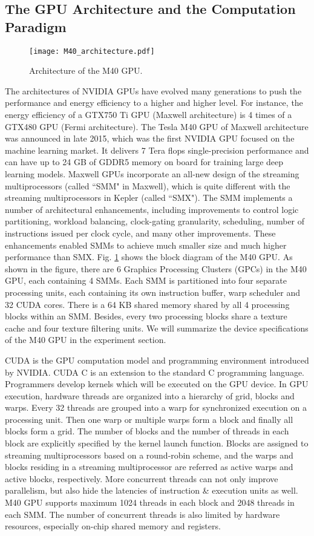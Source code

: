 \documentclass[format=acmsmall, review=false, screen=true]{acmart}
\begin{document}
\subsection{The GPU Architecture and the Computation Paradigm}
\begin{figure}[t]
    \centering
    \texttt{[image: M40\_architecture.pdf]}
    \caption{Architecture of the M40 GPU.}
    \label{pic_m40_architecture}
\end{figure}
The architectures of NVIDIA GPUs have evolved many generations to push the performance and energy efficiency to a higher and higher level. For instance, the energy efficiency of a GTX750 Ti GPU (Maxwell architecture) is 4 times of a GTX480 GPU (Fermi architecture). The Tesla M40 GPU of Maxwell architecture was announced in late 2015, which was the first NVIDIA GPU focused on the machine learning market. It delivers 7 Tera flops single-precision performance and can have up to 24 GB of GDDR5 memory on board for training large deep learning models. Maxwell GPUs incorporate an all-new design of the streaming multiprocessors (called ``SMM" in Maxwell), which is quite different with the streaming multiprocessors in Kepler (called ``SMX"). The SMM implements a number of architectural enhancements, including improvements to control logic partitioning, workload balancing, clock-gating granularity, scheduling, number of instructions issued per clock cycle, and many other improvements. These enhancements enabled SMMs to achieve much smaller size and much higher performance than SMX. Fig. \ref{pic_m40_architecture} shows the block diagram of the M40 GPU. As shown in the figure, there are 6 Graphics Processing Clusters (GPCs) in the M40 GPU, each containing 4 SMMs. Each SMM is partitioned into four separate processing units, each containing its own instruction buffer, warp scheduler and 32 CUDA cores.  There is a 64 KB shared memory shared by all 4 processing blocks within an SMM. Besides, every two processing blocks share a texture cache and four texture filtering units. We will summarize the device specifications of the M40 GPU in the experiment section.

CUDA is the GPU computation model and programming environment introduced by NVIDIA. CUDA C is an extension to the standard C programming language. Programmers develop kernels which will be executed on the GPU device. In GPU execution, hardware threads are organized into a hierarchy of grid, blocks and warps. Every 32 threads are grouped into a warp for synchronized execution on a processing unit. Then one warp or multiple warps form a block and finally all blocks form a grid. The number of blocks and the number of threads in each block are explicitly specified by the kernel launch function. Blocks are assigned to streaming multiprocessors based on a round-robin scheme, and the warps and blocks residing in a streaming multiprocessor are referred as active warps and active blocks, respectively. More concurrent threads can not only improve parallelism, but also hide the latencies of instruction \& execution units as well. M40 GPU supports maximum 1024 threads in each block and 2048 threads in each SMM. The number of concurrent threads is also limited by hardware resources, especially on-chip shared memory and registers.
\end{document}
